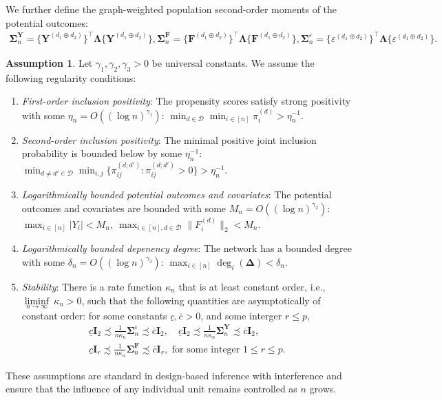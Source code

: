 \documentclass{article}
\theoremstyle{plain}
\theoremstyle{definition}
\newtheorem{assumption}[theorem]{Assumption}
\theoremstyle{remark}
\newcommand{\bY}{\boldsymbol{Y}}
\newcommand{\bF}{\boldsymbol{F}}
\newcommand{\bI}{\boldsymbol{I}}
\newcommand{\bLambda}{\boldsymbol{\Lambda}}
\newcommand{\bSigma}{\boldsymbol{\Sigma}}
\newcommand{\bDelta}{\boldsymbol{\Delta}}
\newcommand{\cD}{\mathcal{D}}
\begin{document}
We further define the graph-weighted population second-order moments
of the potential outcomes:
\begin{gather*}
\bSigma^{\bY}_n = \{\bY^{(d_1 \oplus d_2)}\}^{\top} \bLambda \{\bY^{(d_1 \oplus d_2)}\}, 
\bSigma^{\bF}_n = \{\bF^{(d_1 \oplus d_2)}\}^{\top} \bLambda \{\bF^{(d_1 \oplus d_2)}\}, 
\bSigma^{\varepsilon}_n = \{\varepsilon^{(d_1 \oplus d_2)}\}^{\top} \bLambda \{\varepsilon^{(d_1 \oplus d_2)}\}.
\end{gather*}
\begin{assumption}
    Let $\gamma_1, \gamma_2, \gamma_3 > 0$ be universal constants. We assume the following regularity conditions: 
    \begin{enumerate}[label=(\alph*), ref=\theassumption (\alph*)]
        \item \label{asp::positivity_a} \textit{  First-order inclusion positivity}: The propensity scores satisfy strong positivity with some  $\eta_n = O((\log n)^{\gamma_1})$: $
        \min_{d\in\cD} \min_{i\in[n]} \pi_i^{(d)} > \eta_n^{-1}$.

        \item \label{asp::positivity_b} \textit{Second-order inclusion positivity}: The minimal positive joint inclusion probability is bounded below by some $\eta_n^{-1}$: $\min_{d\neq d'\in\cD} \min_{i,j} \{\pi_{ij}^{(d;d')}: \pi_{ij}^{(d;d')} > 0\} > \eta_n^{-1}$. 

        \item \label{asp::bound} \textit{Logarithmically bounded potential outcomes and covariates}: The potential outcomes and covariates are bounded with some $M_n = O((\log n)^{\gamma_2})$: $\max_{i\in[n]} |Y_i| < M_n, ~ \max_{i\in[n], d\in\cD} \|F_i^{(d)}\|_2 < M_n$.

        \item \label{asp::bounded_degree} \textit{Logarithmically bounded depenency degree}: The network has a bounded degree with some $\delta_n = O((\log n)^{\gamma_3})$: $\max_{i\in[n]} \deg_i(\bDelta) < \delta_n$.

        \item \label{asp::stability} \textit{Stability}: 
        There is a rate function $\kappa_n$ that is at least constant order, i.e., $ \underset{n\to\infty}{\liminf} ~\kappa_n > 0$, such that the following quantities are asymptotically of constant order: for some constants $\underline{c}, \overline{c} > 0$, and some interger $r \le p$,
        \begin{gather}
            \underline{c}\bI_2\precsim\frac{1}{n\kappa_n}\bSigma^{\varepsilon}_n \precsim \overline{c}\bI_2, \quad \underline{c}\bI_2\precsim\frac{1}{n\kappa_n}\bSigma^{\bY}_n \precsim \overline{c}\bI_2, \\ \underline{c}\bI_r\precsim\frac{1}{n\kappa_n}\bSigma^{\bF}_n \precsim \overline{c}\bI_r, \text{ for some integer } 1 \le r \le p .
        \end{gather}
    \end{enumerate}
\end{assumption}
These assumptions are standard in design-based inference with interference and ensure that the influence of any individual unit remains controlled as $n$ grows.
\end{document}
